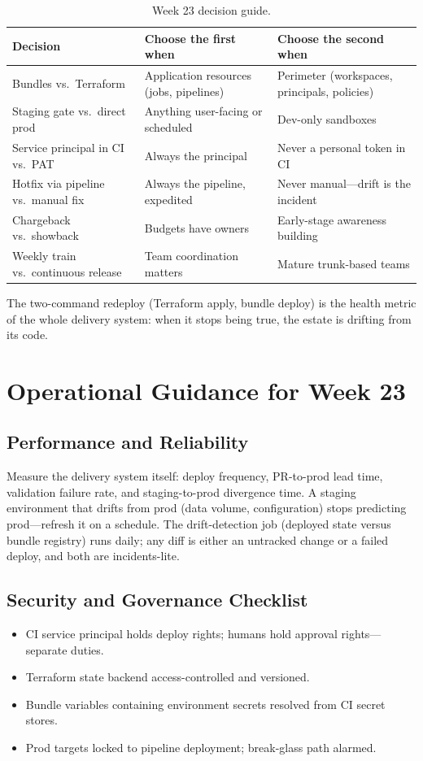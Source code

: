 \begin{table}[H]
\centering
\small
\begin{tabular}{@{}p{3.4cm}p{4.4cm}p{4.6cm}@{}}
\toprule
\textbf{Decision} & \textbf{Choose the first when} & \textbf{Choose the second when} \\
\midrule
Bundles vs.\ Terraform & Application resources (jobs, pipelines) & Perimeter (workspaces, principals, policies) \\
Staging gate vs.\ direct prod & Anything user-facing or scheduled & Dev-only sandboxes \\
Service principal in CI vs.\ PAT & Always the principal & Never a personal token in CI \\
Hotfix via pipeline vs.\ manual fix & Always the pipeline, expedited & Never manual---drift is the incident \\
Chargeback vs.\ showback & Budgets have owners & Early-stage awareness building \\
Weekly train vs.\ continuous release & Team coordination matters & Mature trunk-based teams \\
\bottomrule
\end{tabular}
\caption{Week 23 decision guide.}
\label{tab:ch23-decisions}
\end{table}

The two-command redeploy (Terraform apply, bundle deploy) is the health metric of the whole delivery system: when it stops being true, the estate is drifting from its code.

\section{Operational Guidance for Week 23}
%
\subsection{Performance and Reliability}
Measure the delivery system itself: deploy frequency, PR-to-prod lead time, validation failure rate, and staging-to-prod divergence time. A staging environment that drifts from prod (data volume, configuration) stops predicting prod---refresh it on a schedule. The drift-detection job (deployed state versus bundle registry) runs daily; any diff is either an untracked change or a failed deploy, and both are incidents-lite.

\subsection{Security and Governance Checklist}
\begin{itemize}
    \item CI service principal holds deploy rights; humans hold approval rights---separate duties.
    \item Terraform state backend access-controlled and versioned.
    \item Bundle variables containing environment secrets resolved from CI secret stores.
    \item Prod targets locked to pipeline deployment; break-glass path alarmed.
\end{itemize}

